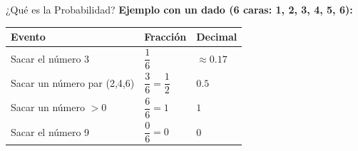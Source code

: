 \documentclass[12pt, letterpaper]{article}
\begin{document}
\begin{concepto}{¿Qué es la Probabilidad?}
		\textbf{Ejemplo con un dado (6 caras: 1, 2, 3, 4, 5, 6):}
		
		\begin{center}
			\renewcommand{\arraystretch}{1.6}
			\begin{tabular}{|m{5cm}|m{2.5cm}|m{3.5cm}|}
				\hline
				\rowcolor{valpurple!15}
				\textbf{Evento} & \textbf{Fracción} & \textbf{Decimal} \\
				\hline
				Sacar el número 3 &
				$\dfrac{1}{6}$ & $\approx 0.17$ \\
				\hline
				Sacar un número par (2,4,6) &
				$\dfrac{3}{6} = \dfrac{1}{2}$ & $0.5$ \\
				\hline
				Sacar un número $> 0$ &
				$\dfrac{6}{6} = 1$ & $1$ \\
				\hline
				Sacar el número 9 &
				$\dfrac{0}{6} = 0$ & $0$ \\
				\hline
			\end{tabular}
		\end{center}
	\end{concepto}
	
\end{document}
